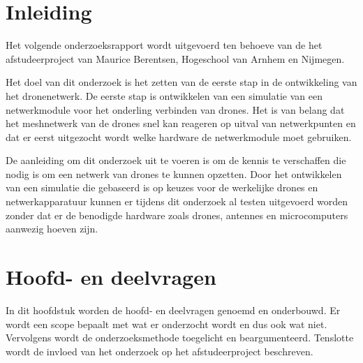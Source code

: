 \documentclass[a4paper, 11pt, oneside]{report}
\begin{document}






\chapter{Inleiding}
\label{chapter:inleiding}


Het volgende onderzoeksrapport wordt uitgevoerd ten behoeve van de het afstudeerproject van Maurice Berentsen, Hogeschool van Arnhem en Nijmegen.

Het doel van dit onderzoek is het zetten van de eerste stap in de ontwikkeling van het dronenetwerk.
De eerste stap is ontwikkelen van een simulatie van een netwerkmodule voor het onderling verbinden van drones.
Het is van belang dat het meshnetwerk van de drones snel kan reageren op uitval van netwerkpunten en dat er eerst uitgezocht wordt welke hardware de netwerkmodule moet gebruiken.

De aanleiding om dit onderzoek uit te voeren is om de kennis te verschaffen die nodig is om een netwerk van drones te kunnen opzetten.
Door het ontwikkelen van een simulatie die gebaseerd is op keuzes voor de werkelijke drones en netwerkapparatuur kunnen er tijdens dit onderzoek al testen uitgevoerd worden zonder dat er de benodigde hardware zoals drones, antennes en microcomputers aanwezig hoeven zijn. 


\chapter{Hoofd- en deelvragen}
In dit hoofdstuk worden de hoofd- en deelvragen genoemd en onderbouwd.
Er wordt een scope bepaalt met wat er onderzocht wordt en dus ook wat niet.
Vervolgens wordt de onderzoeksmethode toegelicht en beargumenteerd.
Tenslotte wordt de invloed van het onderzoek op het afstudeerproject beschreven.
\end{document}
